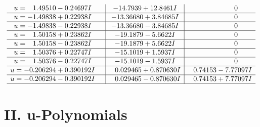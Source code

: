 \documentclass[1p]{elsarticle_modified}
\theoremstyle{definition}
\begin{document}
$$\begin{array}{c|c|c}
\begin{aligned}
u &= \phantom{-}1.49510 - 0.24697 I\end{aligned}
 & -14.7939 + 12.8461 I & \phantom{-0.000000 } 0 \\ \hline\begin{aligned}
u &= -1.49838 + 0.22938 I\end{aligned}
 & -13.36680 + 3.84685 I & \phantom{-0.000000 } 0 \\ \hline\begin{aligned}
u &= -1.49838 - 0.22938 I\end{aligned}
 & -13.36680 - 3.84685 I & \phantom{-0.000000 } 0 \\ \hline\begin{aligned}
u &= \phantom{-}1.50158 + 0.23862 I\end{aligned}
 & -19.1879 - 5.6622 I & \phantom{-0.000000 } 0 \\ \hline\begin{aligned}
u &= \phantom{-}1.50158 - 0.23862 I\end{aligned}
 & -19.1879 + 5.6622 I & \phantom{-0.000000 } 0 \\ \hline\begin{aligned}
u &= \phantom{-}1.50376 + 0.22747 I\end{aligned}
 & -15.1019 + 1.5937 I & \phantom{-0.000000 } 0 \\ \hline\begin{aligned}
u &= \phantom{-}1.50376 - 0.22747 I\end{aligned}
 & -15.1019 - 1.5937 I & \phantom{-0.000000 } 0 \\ \hline\begin{aligned}
u &= -0.206294 + 0.390192 I\end{aligned}
 & \phantom{-}0.029465 + 0.870630 I & \phantom{-}0.74153 - 7.77097 I \\ \hline\begin{aligned}
u &= -0.206294 - 0.390192 I\end{aligned}
 & \phantom{-}0.029465 - 0.870630 I & \phantom{-}0.74153 + 7.77097 I\\
 \hline 
 \end{array}$$\newpage
\newpage\renewcommand{\arraystretch}{1}
\centering \section*{ II. u-Polynomials}
\end{document}
